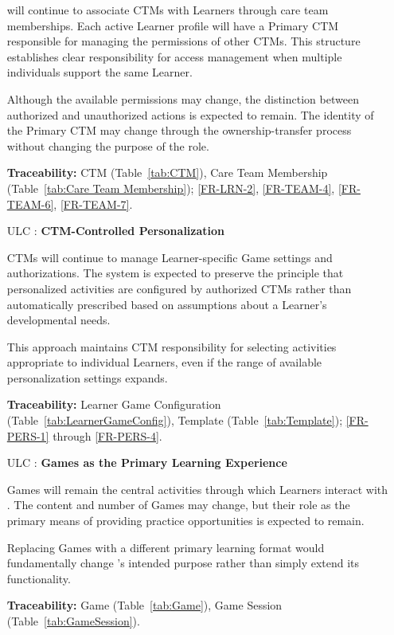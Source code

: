 \documentclass[12pt]{article}
\newcounter{lcnum} %
\begin{document}
\begin{itemize}
\progname{} will continue to associate CTMs with Learners through care team
memberships. Each active Learner profile will have a Primary CTM responsible for
managing the permissions of other CTMs. This structure establishes clear
responsibility for access management when multiple individuals support the same
Learner.

Although the available permissions may change, the distinction between
authorized and unauthorized actions is expected to remain. The identity of the
Primary CTM may change through the ownership-transfer process without changing
the purpose of the role.

\textbf{Traceability:} CTM (Table~\ref{tab:CTM}), Care Team Membership
(Table~\ref{tab:Care Team Membership}); \ref{FR-LRN-2}, \ref{FR-TEAM-4},
\ref{FR-TEAM-6}, \ref{FR-TEAM-7}.

\item[ULC\refstepcounter{ulcnum}\arabic{ulcnum}
  \label{ULC_Personalization}:] \textbf{CTM-Controlled Personalization}

CTMs will continue to manage Learner-specific Game settings and authorizations.
The system is expected to preserve the principle that personalized activities
are configured by authorized CTMs rather than automatically prescribed based on
assumptions about a Learner's developmental needs.

This approach maintains CTM responsibility for selecting activities appropriate
to individual Learners, even if the range of available personalization settings
expands.

\textbf{Traceability:} Learner Game Configuration
(Table~\ref{tab:LearnerGameConfig}), Template (Table~\ref{tab:Template});
\ref{FR-PERS-1} through \ref{FR-PERS-4}.

\item[ULC\refstepcounter{ulcnum}\arabic{ulcnum}
  \label{ULC_Games}:] \textbf{Games as the Primary Learning Experience}

Games will remain the central activities through which Learners interact with
\progname{}. The content and number of Games may change, but their role as the
primary means of providing practice opportunities is expected to remain.

Replacing Games with a different primary learning format would fundamentally
change \progname{}'s intended purpose rather than simply extend its
functionality.

\textbf{Traceability:} Game (Table~\ref{tab:Game}), Game Session
(Table~\ref{tab:GameSession}).


\end{itemize}
\end{document}
